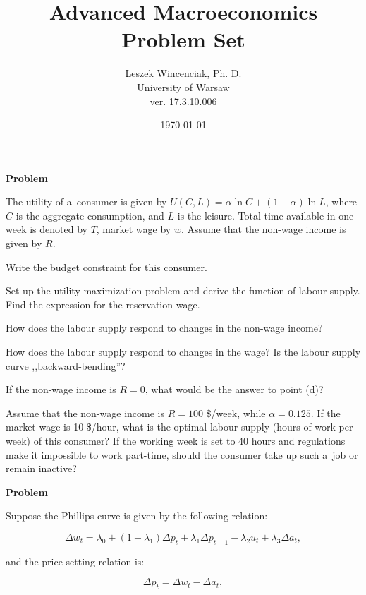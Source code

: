 \documentclass[a4paper, notitlepage, 11pt]{article}
\title{Advanced Macroeconomics Problem Set}
\author{Leszek Wincenciak, Ph. D.\\ University of Warsaw\\ ver. 17.3.10.006}
\date{\today}
\newcounter{zadlicz}[section]%
\newcommand{\tytul}[2]{\setcounter{equation}{0}\addtocounter{zadlicz}{1}\vspace{\abovedisplayskip}\noindent\textbf{#1\ \thezadlicz #2}}%
\begin{document}
\maketitle

\tytul{Problem}{}

\noindent%
The utility of a~consumer is given by $U(C,L)=\alpha\ln C + (1-\alpha)\ln L$, where $C$ is the aggregate consumption, and $L$ is the leisure. Total time available in one week is denoted by $T$, market wage by $w$. Assume that the non-wage income is given by $R$.

\begin{wylicz}
\item Write the budget constraint for this consumer.
\item Set up the utility maximization problem and derive the function of labour supply. Find the expression for the reservation wage.
\item How does the labour supply respond to changes in the non-wage income?
\item How does the labour supply respond to changes in the wage? Is the labour supply curve ,,backward-bending''?
\item If the non-wage income is $R=0$, what would be the answer to point (d)?
\end{wylicz}

Assume that the non-wage income is $R=100$ \$/week, while $\alpha=0.125$. If the market wage is 10 \$/hour, what is the optimal labour supply (hours of work per week) of this consumer? If the working week is set to 40 hours and regulations make it impossible to work part-time, should the consumer take up such a~job or remain inactive?

\tytul{Problem}{}

\noindent%
Suppose the Phillips curve is given by the following relation:

\begin{equation}
\Delta w_t=\lambda_0 + (1-\lambda_1)\Delta p_t + \lambda_1\Delta p_{t-1}-\lambda_2 u_t + \lambda_3\Delta a_t,\label{phillips}
\end{equation}

and the price setting relation is:

\begin{equation}
\Delta p_t=\Delta w_t - \Delta a_t,\label{price}
\end{equation}
\end{document}
